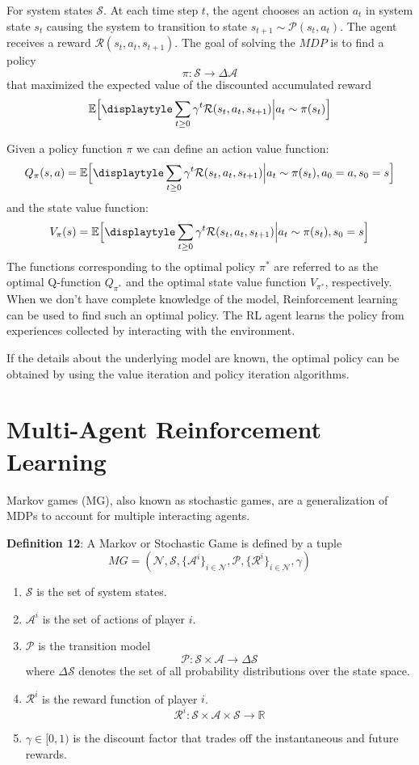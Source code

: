 \documentclass[conference]{IEEEtran}
\begin{document}
\par For  system states $\mathcal{S}$. At each time step $t$, the agent chooses an action $a_t$ in system state $s_t$ causing the system to transition to state $s_{t+1} \sim \mathcal{P}(s_t, a_t)$. The agent receives a reward $\mathcal{R}(s_t, a_t, s_{t+1})$. The goal of solving the $MDP$ is to find a policy $$\pi \mathpunct{:} \mathcal{S} \to \Delta \mathcal{A}$$ that maximized the expected value of the discounted accumulated reward $$\mathbb{E}\Big[\displaytyle\sum_{t\geq 0}\gamma^t\mathcal{R}(s_t, a_t, s_{t+1})\Big| a_t \sim \pi(s_t)\Big]$$

\par Given a policy function $\pi$ we can define an action value function: $$Q_{\pi}(s, a) = \mathbb{E}\Big[\displaytyle\sum_{t\geq 0}\gamma^t\mathcal{R}(s_t, a_t, s_{t+1})\Big| a_t \sim \pi(s_t), a_0 = a, s_0 = s\Big]$$ and the state value function:
$$V_{\pi}(s) = \mathbb{E}\Big[\displaytyle\sum_{t\geq 0}\gamma^t\mathcal{R}(s_t, a_t, s_{t+1})\Big| a_t \sim \pi(s_t), s_0 = s\Big]$$ The functions corresponding to the optimal policy $\pi^*$ are referred to as the optimal Q-function $Q_{\pi^*}$ and the optimal state value function $V_{\pi^*}$, respectively. When we don't have complete knowledge of the model, Reinforcement learning can be used to find such an optimal policy. The RL agent learns the policy from experiences collected by interacting with the environment. 

\par If the details about the underlying model are known, the optimal policy can be obtained by using the value iteration and policy iteration algorithms.  

\section{Multi-Agent Reinforcement Learning}

Markov games (MG), also known as stochastic games, are a generalization of MDPs to account for multiple interacting agents.

\textbf{Definition 12}: A Markov or Stochastic Game is defined by a tuple $$MG = (\mathcal{N}, \mathcal{S}, \{\mathcal{A}^i\}_{i\in\mathcal{N}} , \mathcal{P}, \{\mathcal{R}^i\}_{i\in\mathcal{N}}, \gamma)$$
\begin{enumerate}
\item $\mathcal{S}$ is the set of system states.
\item $\mathcal{A}^i$ is the set of actions of player $i$.
\item $\mathcal{P}$ is the transition model $$\mathcal{P} \mathpunct{:} \mathcal{S} \times \mathcal{A} \to \Delta \mathcal{S}$$ where $\Delta \mathcal{S}$ denotes the set of all probability distributions over the state space.
\item $\mathcal{R}^i$ is the reward function of player $i$.
$$\mathcal{R}^i \mathpunct{:} \mathcal{S} \times \mathcal{A} \times \mathcal{S} \to \mathbb{R}$$
\item $\gamma \in [0, 1)$ is the discount factor that trades off the instantaneous and
future rewards.

\end{enumerate}
\end{document}
